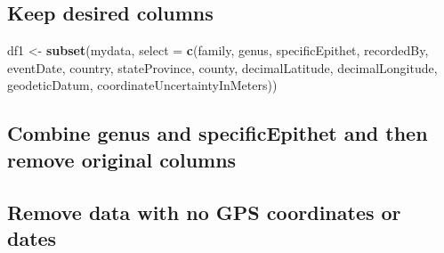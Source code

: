 \documentclass[
]{article}
\newenvironment{Shaded}{\begin{snugshade}}{\end{snugshade}}
\newcommand{\DataTypeTok}[1]{\textcolor[rgb]{0.13,0.29,0.53}{#1}}
\newcommand{\KeywordTok}[1]{\textcolor[rgb]{0.13,0.29,0.53}{\textbf{#1}}}
\newcommand{\NormalTok}[1]{#1}
\newcommand{\OperatorTok}[1]{\textcolor[rgb]{0.81,0.36,0.00}{\textbf{#1}}}
\newcommand{\StringTok}[1]{\textcolor[rgb]{0.31,0.60,0.02}{#1}}
\begin{document}
\hypertarget{keep-desired-columns}{%
\subsection{Keep desired columns}\label{keep-desired-columns}}

\begin{Shaded}
\begin{Highlighting}[]
\NormalTok{df1 <-}\StringTok{ }\KeywordTok{subset}\NormalTok{(mydata, }\DataTypeTok{select =} \KeywordTok{c}\NormalTok{(family, genus, specificEpithet, recordedBy, eventDate, country, stateProvince, county, decimalLatitude, decimalLongitude, geodeticDatum, coordinateUncertaintyInMeters))}
\end{Highlighting}
\end{Shaded}

\hypertarget{combine-genus-and-specificepithet-and-then-remove-original-columns}{%
\subsection{Combine genus and specificEpithet and then remove original
columns}\label{combine-genus-and-specificepithet-and-then-remove-original-columns}}

\begin{Shaded}
\end{Shaded}

\hypertarget{remove-data-with-no-gps-coordinates-or-dates}{%
\subsection{Remove data with no GPS coordinates or
dates}\label{remove-data-with-no-gps-coordinates-or-dates}}

\begin{Shaded}
\end{Shaded}
\end{document}
